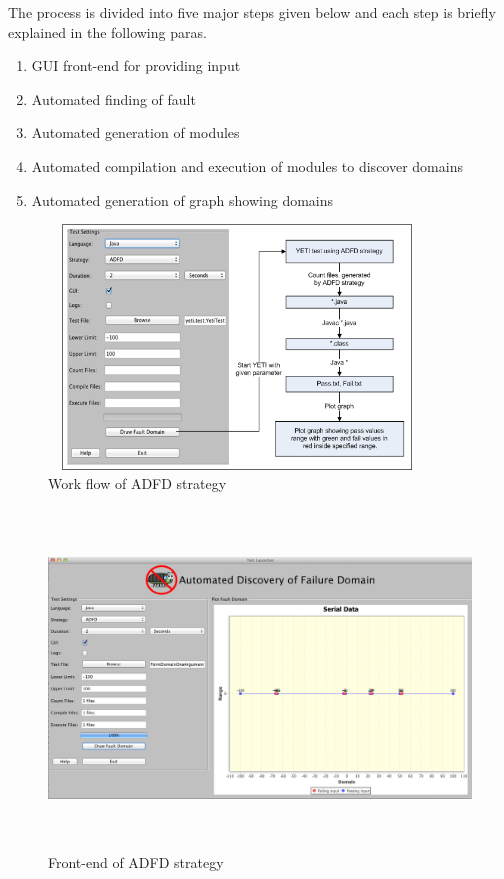 The process is divided into five major steps given below and each step is briefly explained in the following paras.

\begin{enumerate}
\item GUI front-end for providing input
\item Automated finding of fault
\item Automated generation of modules
\item Automated compilation and execution of modules to discover domains
\item Automated generation of graph showing domains
\end{enumerate}

\begin{figure}[ht]
\centering
\includegraphics[width=10cm,height=6.5cm]{chapter5/ADFD_Diagram1.png}
\caption{Work flow of ADFD strategy}
\label{fig:ADFD-workflow}
\end{figure}

\begin{figure}[htp]
\begin{center}
\includegraphics[width=14cm,height=9cm]{chapter5/ADFD_front_end.png}
\caption{Front-end of ADFD strategy}
\label{fig:ADFD-frontend}
\end{center}
\end{figure}

